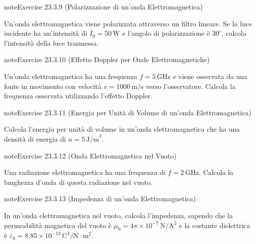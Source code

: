 \documentclass[letterpaper,10pt,italian]{jupyterBook}
\begin{document}
\begin{sphinxadmonition}{note}{Exercise 23.3.9 (Polarizzazione di un’onda Elettromagnetica)}



\sphinxAtStartPar
Un’onda elettromagnetica viene polarizzata attraverso un filtro lineare. Se la luce incidente ha un’intensità di \(I_0 = 50 \, \text{W}\) e l’angolo di polarizzazione è \(30^\circ\), calcola l’intensità della luce trasmessa.
\end{sphinxadmonition}
 \label{exercise:ch/electromagnetism/em-waves-problems-exercise-9}

\begin{sphinxadmonition}{note}{Exercise 23.3.10 (Effetto Doppler per Onde Elettromagnetiche)}



\sphinxAtStartPar
Un’onda elettromagnetica ha una frequenza \(f = 5 \, \text{GHz}\) e viene osservata da una fonte in movimento con velocità \(v = 1000 \, \text{m/s}\) verso l’osservatore. Calcola la frequenza osservata utilizzando l’effetto Doppler.
\end{sphinxadmonition}
 \label{exercise:ch/electromagnetism/em-waves-problems-exercise-10}

\begin{sphinxadmonition}{note}{Exercise 23.3.11 (Energia per Unità di Volume di un’onda Elettromagnetica)}



\sphinxAtStartPar
Calcola l’energia per unità di volume in un’onda elettromagnetica che ha una densità di energia di \(u = 5 \, \text{J/m}^3\).
\end{sphinxadmonition}
 \label{exercise:ch/electromagnetism/em-waves-problems-exercise-11}

\begin{sphinxadmonition}{note}{Exercise 23.3.12 (Onda Elettromagnetica nel Vuoto)}



\sphinxAtStartPar
Una radiazione elettromagnetica ha una frequenza di \(f = 2 \, \text{GHz}\). Calcola la lunghezza d’onda di questa radiazione nel vuoto.
\end{sphinxadmonition}
 \label{exercise:ch/electromagnetism/em-waves-problems-exercise-12}

\begin{sphinxadmonition}{note}{Exercise 23.3.13 (Impedenza di un’onda Elettromagnetica)}



\sphinxAtStartPar
In un’onda elettromagnetica nel vuoto, calcola l’impedenza, sapendo che la permeabilità magnetica del vuoto è \(\mu_0 = 4\pi \times 10^{-7} \, \text{N}/\text{A}^2\) e la costante dielettrica è \(\varepsilon_0 = 8.85 \times 10^{-12} \, \text{C}^2/\text{N} \cdot \text{m}^2\).
\end{sphinxadmonition}
 \label{exercise:ch/electromagnetism/em-waves-problems-exercise-13}
\end{document}
